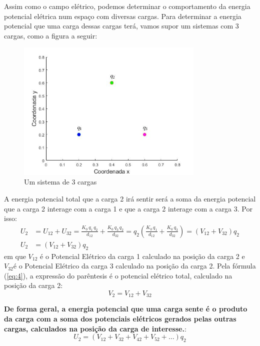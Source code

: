 \documentclass[12pt]{extarticle}
\newcommand{\<}{\langle}
\renewcommand{\>}{\rangle}
\theoremstyle{definition}
\begin{document}
Assim como o campo elétrico, podemos determinar o comportamento da energia potencial elétrica num espaço com diversas cargas. Para determinar a energia potencial que uma carga dessas cargas terá, vamos supor um sistemas com 3 cargas, como a figura a seguir:
\begin{figure}[H]
    \centering
    \includegraphics[width=0.8\textwidth]{ex_1.jpg}
    \caption{Um sistema de 3 cargas}
    \label{fig:ex_1}
\end{figure}

A energia potencial total que a carga 2 irá sentir será a soma da energia potencial que a carga 2 interage com a carga 1 e que a carga 2 interage com a carga 3. Por isso:
\begin{equation}
\begin{split}
    U_2 &= U_{12} + U_{32} = \frac{K_0\,q_1\,q_2}{d_{12}} + \frac{K_0\,q_3\,q_2}{d_{32}} = q_2\left(\frac{K_0\,q_1}{d_{12}} + \frac{K_0\,q_3}{d_{32}}\right) = (V_{12} +V_{32})q_2\\
    U_2 &=(V_{12} +V_{32})q_2
    \end{split}
\end{equation}
\noindent em que $V_{12}$ é o Potencial Elétrico da carga 1 calculado na posição da carga 2 e $V_{32}$é o Potencial Elétrico da carga 3 calculado na posição da carga 2. Pela fórmula (\ref{eq:4}), a expressão do parêntesis é o potencial elétrico total, calculado na posição da carga 2:
\begin{equation}
    V_2 = V_{12} +V_{32}
\end{equation}

\textbf{De forma geral, a energia potencial que uma carga sente é o produto da carga com a soma dos potenciais elétricos gerados pelas outras cargas, calculados na posição da carga de interesse.}:
\begin{equation}
    U_2 = (V_{12} + V_{32} + V_{42} + V_{52} + \dots)q_2
\end{equation}
\end{document}
